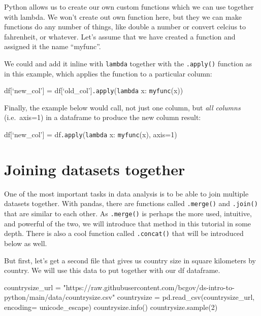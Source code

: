 \documentclass[
  letterpaper,
  DIV=11,
  numbers=noendperiod]{scrreprt}
\newenvironment{Shaded}{\begin{snugshade}}{\end{snugshade}}
\newcommand{\DecValTok}[1]{\textcolor[rgb]{0.68,0.00,0.00}{#1}}
\newcommand{\NormalTok}[1]{\textcolor[rgb]{0.00,0.23,0.31}{#1}}
\newcommand{\OperatorTok}[1]{\textcolor[rgb]{0.37,0.37,0.37}{#1}}
\newcommand{\StringTok}[1]{\textcolor[rgb]{0.13,0.47,0.30}{#1}}
\begin{document}
Python allows us to create our own custom functions which we can use
together with lambda. We won't create out own function here, but they we
can make functions do any number of things, like double a number or
convert celcius to fahrenheit, or whatever. Let's assume that we have
created a function and assigned it the name ``myfunc''.

We could and add it inline with \texttt{lambda} together with the
\texttt{.apply()} function as in this example, which applies the
function to a particular column:

df{[}`new\_col'{]} = df{[}`old\_col'{]}\texttt{.apply}(\texttt{lambda}
x: \texttt{myfunc}(x))

Finally, the example below would call, not just one column, but
\emph{all columns} (i.e.~axis=1) in a dataframe to produce the new
column result:

df{[}`new\_col'{]} = df\texttt{.apply}(\texttt{lambda} x:
\texttt{myfunc}(x), axis=1)

\hypertarget{joining-datasets-together}{%
\section{Joining datasets together}\label{joining-datasets-together}}

One of the most important tasks in data analysis is to be able to join
multiple datasets together. With pandas, there are functions called
\texttt{.merge()} and \texttt{.join()} that are similar to each other.
As \texttt{.merge()} is perhaps the more used, intuitive, and powerful
of the two, we will introduce that method in this tutorial in some
depth. There is also a cool function called \texttt{.concat()} that will
be introduced below as well.

But first, let's get a second file that gives us country size in square
kilometers by country. We will use this data to put together with our df
dataframe.

\begin{Shaded}
\begin{Highlighting}[]
\NormalTok{countrysize\_url }\OperatorTok{=} \StringTok{"https://raw.githubusercontent.com/bcgov/ds{-}intro{-}to{-}python/main/data/countrysize.csv"}
\NormalTok{countrysize }\OperatorTok{=}\NormalTok{ pd.read\_csv(countrysize\_url, encoding}\OperatorTok{=} \StringTok{\textquotesingle{}unicode\_escape\textquotesingle{}}\NormalTok{)}
\NormalTok{countrysize.info()}
\NormalTok{countrysize.sample(}\DecValTok{2}\NormalTok{)}
\end{Highlighting}
\end{Shaded}
\end{document}
